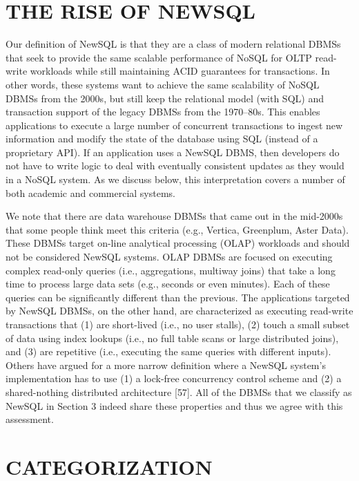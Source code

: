 \documentclass[a4paper,11pt,twoside,openright]{article}
\begin{document}
\hypertarget{the-rise-of-newsql}{%
\section{THE RISE OF NEWSQL}\label{the-rise-of-newsql}}

Our definition of NewSQL is that they are a class of modern relational
DBMSs that seek to provide the same scalable performance of NoSQL for
OLTP read-write workloads while still maintaining ACID guarantees for
transactions. In other words, these systems want to achieve the same
scalability of NoSQL DBMSs from the 2000s, but still keep the relational
model (with SQL) and transaction support of the legacy DBMSs from the
1970--80s. This enables applications to execute a large number of
concurrent transactions to ingest new information and modify the state
of the database using SQL (instead of a proprietary API). If an
application uses a NewSQL DBMS, then developers do not have to write
logic to deal with eventually consistent updates as they would in a
NoSQL system. As we discuss below, this interpretation covers a number
of both academic and commercial systems.

We note that there are data warehouse DBMSs that came out in the
mid-2000s that some people think meet this criteria (e.g., Vertica,
Greenplum, Aster Data). These DBMSs target on-line analytical processing
(OLAP) workloads and should not be considered NewSQL systems. OLAP DBMSs
are focused on executing complex read-only queries (i.e., aggregations,
multiway joins) that take a long time to process large data sets (e.g.,
seconds or even minutes). Each of these queries can be significantly
different than the previous. The applications targeted by NewSQL DBMSs,
on the other hand, are characterized as executing read-write
transactions that (1) are short-lived (i.e., no user stalls), (2) touch
a small subset of data using index lookups (i.e., no full table scans or
large distributed joins), and (3) are repetitive (i.e., executing the
same queries with different inputs). Others have argued for a more
narrow definition where a NewSQL system's implementation has to use (1)
a lock-free concurrency control scheme and (2) a shared-nothing
distributed architecture {[}57{]}. All of the DBMSs that we classify as
NewSQL in Section 3 indeed share these properties and thus we agree with
this assessment.

\hypertarget{categorization}{%
\section{CATEGORIZATION}\label{categorization}}
\end{document}
